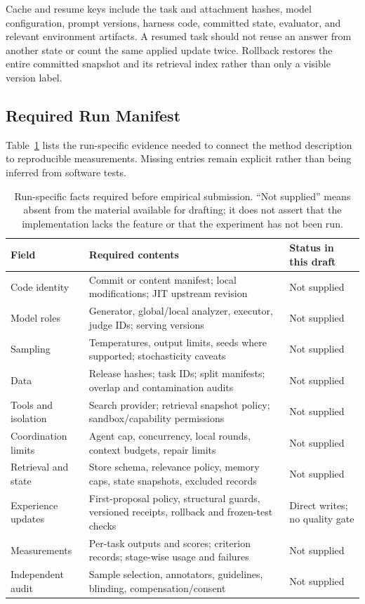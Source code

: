 Cache and resume keys include the task and attachment hashes, model configuration, prompt versions, harness code, committed state, evaluator, and relevant environment artifacts. A resumed task should not reuse an answer from another state or count the same applied update twice. Rollback restores the entire committed snapshot and its retrieval index rather than only a visible version label.

\subsection{Required Run Manifest}
\label{app:manifest}

Table~\ref{tab:manifest} lists the run-specific evidence needed to connect the method description to reproducible measurements. Missing entries remain explicit rather than being inferred from software tests.

\begin{table}[t]
\centering\small
\begin{tabularx}{\textwidth}{p{3.0cm}XX}
\toprule
Field & Required contents & Status in this draft\\
\midrule
Code identity & Commit or content manifest; local modifications; JIT upstream revision & Not supplied\\
Model roles & Generator, global/local analyzer, executor, judge IDs; serving versions & Not supplied\\
Sampling & Temperatures, output limits, seeds where supported; stochasticity caveats & Not supplied\\
Data & Release hashes; task IDs; split manifests; overlap and contamination audits & Not supplied\\
Tools and isolation & Search provider; retrieval snapshot policy; sandbox/capability permissions & Not supplied\\
Coordination limits & Agent cap, concurrency, local rounds, context budgets, repair limits & Not supplied\\
Retrieval and state & Store schema, relevance policy, memory caps, state snapshots, excluded records & Not supplied\\
Experience updates & First-proposal policy, structural guards, versioned receipts, rollback and frozen-test checks & Direct writes; no quality gate\\
Measurements & Per-task outputs and scores; criterion records; stage-wise usage and failures & Not supplied\\
Independent audit & Sample selection, annotators, guidelines, blinding, compensation/consent & Not supplied\\
\bottomrule
\end{tabularx}
\caption{Run-specific facts required before empirical submission. ``Not supplied'' means absent from the material available for drafting; it does not assert that the implementation lacks the feature or that the experiment has not been run.}
\label{tab:manifest}
\end{table}

